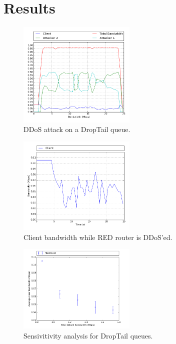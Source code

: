 \documentclass[12pt,twocolumn]{article}
\begin{document}
\section{Results}
\begin{figure}[t!]
    \centering
    \includegraphics[width=0.5\textwidth]{../Results/tbf.png} \caption{DDoS attack on a DropTail queue.} \label{tbf1}
\end{figure}

\begin{figure}[t!]
    \centering
    \includegraphics[width=0.5\textwidth]{../Results/red_client.png} \caption{Client bandwidth while RED router is DDoS'ed.} \label{red1}
\end{figure}


\begin{figure}[h!]
    \centering
    \includegraphics[width=0.5\textwidth]{../Results/result-tbf.png} \caption{Sensivitivity analysis for DropTail queues.} \label{tbf2}
\end{figure}
\end{document}
